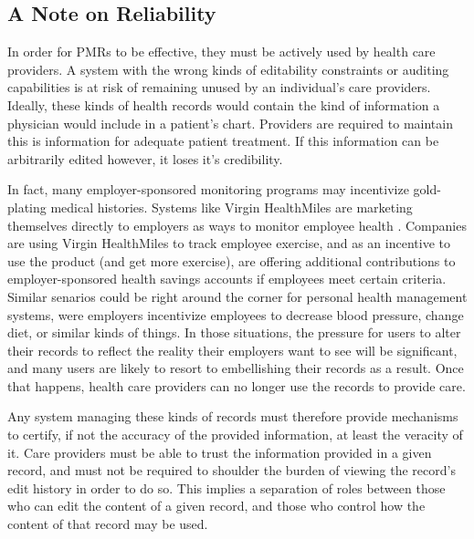 \documentclass[10pt, conference, compsocconf]{IEEEtran}
\begin{document}
\subsection{A Note on Reliability}
In order for PMRs to be effective, they must be actively used by health care providers.  A system with the wrong kinds of editability constraints or auditing capabilities is at risk of remaining unused by an individual's care providers.  Ideally, these kinds of health records would contain the kind of information a physician would include in a patient's chart.  Providers are required to maintain this is information for adequate patient treatment.  If this information can be arbitrarily edited however, it loses it's credibility.

In fact, many employer-sponsored monitoring programs may incentivize gold-plating medical histories.  Systems like Virgin HealthMiles are marketing themselves directly to employers as ways to monitor employee health \cite{Emr:Web:VirginHealthMiles}.  Companies are using Virgin HealthMiles to track employee exercise, and as an incentive to use the product (and get more exercise), are offering additional contributions to employer-sponsored health savings accounts if employees meet certain criteria.  Similar senarios could be right around the corner for personal health management systems, were employers incentivize employees to decrease blood pressure, change diet, or similar kinds of things.  In those situations, the pressure for users to alter their records to reflect the reality their employers want to see will be significant, and many users are likely to resort to embellishing their records as a result. Once that happens, health care providers can no longer use the records to provide care.

Any system managing these kinds of records must therefore provide mechanisms to certify, if not the accuracy of the provided information, at least the veracity of it.  Care providers must be able to trust the information provided in a given record, and must not be required to shoulder the burden of viewing the record's edit history in order to do so.  This implies a separation of roles between those who can edit the content of a given record, and those who control how the content of that record may be used.
\end{document}
